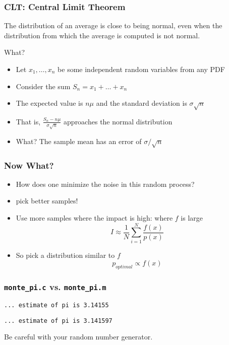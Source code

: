 \documentclass[10pt]{beamer}
\begin{document}
\begin{frame}
\frametitle{CLT: Central Limit Theorem}
\begin{block}{}
  The distribution of an average is close to being normal, even when the distribution from which the average is computed is not normal.
\end{block}
What?
\begin{itemize}
  \item Let $x_1,\dots,x_n$ be some independent random variables from any PDF
  \item Consider the sum $S_n = x_1 + \dots + x_n$
  \item The expected value is $n\mu$ and the standard deviation is
$\sigma \sqrt{n}$
  \item That is, $\frac{S_n - n\mu}{\sigma\sqrt{n}}$ approaches the
normal distribution
  \item What?  The sample mean has an error of $\sigma/\sqrt{n}$
\end{itemize}

\end{frame}
\begin{frame}
\frametitle{Now What?}
\begin{itemize}
  \item How does one minimize the noise in this random process?
  \item pick better samples!
  \item Use more samples where the impact is high: where $f$ is large
  \begin{equation*}
  I \approx \frac{1}{N} \sum_{i=1}^{N} \frac{f(x)}{p(x)}
\end{equation*}
  \item So pick a distribution similar to $f$
  \begin{equation*}
  p_{optimal} \propto f(x)
\end{equation*}
\end{itemize}
\end{frame}
\begin{frame}[fragile]
\frametitle{\texttt{monte\_pi.c} vs. \texttt{monte\_pi.m}}
\begin{lstlisting}[caption=C]
... estimate of pi is 3.14155
\end{lstlisting}
\begin{lstlisting}[caption=matlab]
... estimate of pi is 3.141597
\end{lstlisting}

\begin{alertblock}{}
Be careful with your random number generator.
\end{alertblock}
\end{frame}
\end{document}

